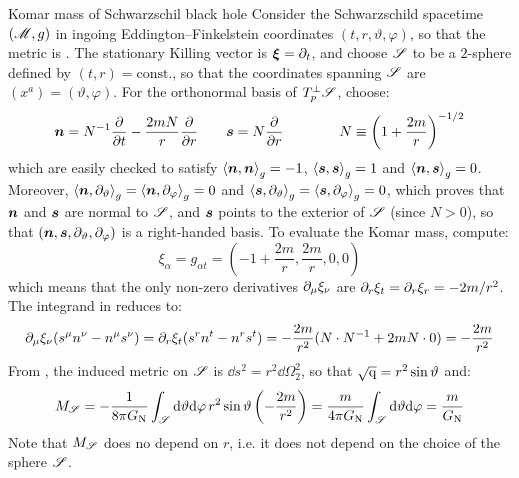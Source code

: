 \begin{example}{Komar mass of Schwarzschil black hole}{}
  Consider the Schwarzschild spacetime $ (\mathscr{M} , g) $ in ingoing Eddington--Finkelstein coordinates $ (t,r,\vartheta,\varphi) $, so that the metric is . The stationary Killing vector is $ \boldsymbol{\xi} = \partial_t $, and choose $ \mathscr{S} $ to be a $ 2 $-sphere defined by $ (t,r) = \text{const.} $, so that the coordinates spanning $ \mathscr{S} $ are $ (x^a) = (\vartheta , \varphi) $. For the orthonormal basis of $ T_p^\perp \mathscr{S} $, choose:
  \begin{equation*}
    \boldsymbol{n} = N^{-1} \frac{\partial}{\partial t} - \frac{2mN}{r} \frac{\partial}{\partial r}
    \qquad
    \boldsymbol{s} = N \frac{\partial}{\partial r}
    \qquad \qquad
    N \equiv \left( 1 + \frac{2m}{r} \right)^{-1/2}
  \end{equation*}
  which are easily checked to satisfy $ \braket{\boldsymbol{n} , \boldsymbol{n}}_g = -1 $, $ \braket{\boldsymbol{s} , \boldsymbol{s}}_g = 1 $ and $ \braket{\boldsymbol{n} , \boldsymbol{s}}_g = 0 $. Moreover, $ \braket{\boldsymbol{n} , \partial_\vartheta}_g = \braket{\boldsymbol{n} , \partial_\varphi}_g = 0 $ and $ \braket{\boldsymbol{s} , \partial_\vartheta}_g = \braket{\boldsymbol{s} , \partial_\varphi}_g = 0 $, which proves that $ \boldsymbol{n} $ and $ \boldsymbol{s} $ are normal to $ \mathscr{S} $, and $ \boldsymbol{s} $ points to the exterior of $ \mathscr{S} $ (since $ N > 0 $), so that $ (\boldsymbol{n} , \boldsymbol{s} , \partial_\vartheta , \partial_\varphi) $ is a right-handed basis. To evaluate the Komar mass, compute:
  \begin{equation*}
    \xi_\alpha = g_{\alpha t} = \left( -1 + \frac{2m}{r} , \frac{2m}{r} , 0 , 0 \right)
  \end{equation*}
  which means that the only non-zero derivatives $ \partial_\mu \xi_\nu $ are $ \partial_r \xi_t = \partial_r \xi_r = - 2m / r^2 $. The integrand in  reduces to:
  \begin{equation*}
    \partial_\mu \xi_\nu (s^\mu n^\nu - n^\mu s^\nu) = \partial_r \xi_t (s^r n^t - n^r s^t) = - \frac{2m}{r^2} (N \cdot N^{-1} + 2mN \cdot 0) = - \frac{2m}{r^2}
  \end{equation*}
  From , the induced metric on $ \mathscr{S} $ is $ \dd s^2 = r^2 \dd \Omega_2^2 $, so that $ \sqrt{\mathrm{q}} = r^2 \sin \vartheta $ and:
  \begin{equation*}
    M_\mathscr{S} = - \frac{1}{8\pi G_\text{N}} \int_\mathscr{S} \mathrm{d} \vartheta \mathrm{d} \varphi \, r^2 \sin \vartheta \left( - \frac{2m}{r^2} \right) = \frac{m}{4\pi G_\text{N}} \int_\mathscr{S} \mathrm{d} \vartheta \mathrm{d} \varphi = \frac{m}{G_\text{N}}
  \end{equation*}
  Note that $ M_\mathscr{S} $ does no depend on $ r $, i.e. it does not depend on the choice of the sphere $ \mathscr{S} $.
\end{example}

